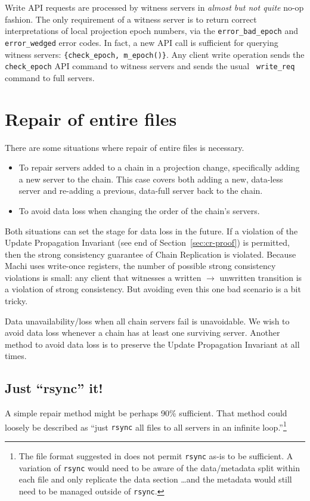 \documentclass[preprint,10pt]{sigplanconf}
\begin{document}
Write API requests are processed by witness servers in {\em almost but
  not quite} no-op fashion.  The only requirement of a witness server
is to return correct interpretations of local projection epoch
numbers, via the {\tt error\_bad\_epoch} and {\tt error\_wedged} error
codes.  In fact, a new API call is sufficient for querying witness
servers: {\tt \{check\_epoch, m\_epoch()\}}.
Any client write operation sends the {\tt
  check\_\-epoch} API command to witness servers and sends the usual {\tt
  write\_\-req} command to full servers.

\section{Repair of entire files}
\label{sec:repair-entire-files}

There are some situations where repair of entire files is necessary.

\begin{itemize}
\item To repair servers added to a chain in a projection change,
  specifically adding a new server to the chain.  This case covers both
  adding a new, data-less server and re-adding a previous, data-full server
  back to the chain.
\item To avoid data loss when changing the order of the chain's servers.
\end{itemize}

Both situations can set the stage for data loss in the future.
If a violation of the Update Propagation Invariant (see end of
Section~\ref{sec:cr-proof}) is permitted, then the strong consistency
guarantee of Chain Replication is violated.  Because Machi uses
write-once registers, the number of possible strong consistency
violations is small: any client that witnesses a written $\rightarrow$
unwritten transition is a violation of strong consistency.  But
avoiding even this one bad scenario is a bit tricky.

Data
unavailability/loss when all chain servers fail is unavoidable.  We
wish to avoid data loss whenever a chain has at least one surviving
server.  Another method to avoid data loss is to preserve the Update
Propagation Invariant at all times.

\subsection{Just ``rsync'' it!}
\label{ssec:just-rsync-it}

A simple repair method might be perhaps 90\% sufficient.
That method could loosely be described as ``just {\tt rsync}
all files to all servers in an infinite loop.''\footnote{The
  file format suggested in
  \cite{machi-design} does not permit {\tt rsync}
  as-is to be sufficient.  A variation of {\tt rsync} would need to be
  aware of the data/metadata split within each file and only replicate
  the data section \ldots and the metadata would still need to be
  managed outside of {\tt rsync}.}
\end{document}
